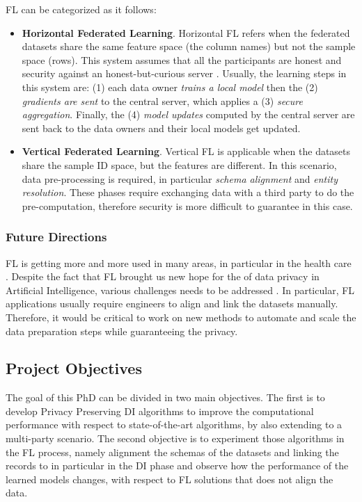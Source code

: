\documentclass[12pt]{article}
\begin{document}
FL can be categorized as it follows: 
\begin{itemize}
   \item \textbf{Horizontal Federated Learning}. Horizontal FL refers when the federated datasets share the same feature space (the column names) but not the sample space (rows). This system
   assumes that all the participants are honest and security against an honest-but-curious server \cite*{Yang2019}. Usually, the learning steps in this system are: (1) 
   each data owner \textit{trains a local model} then the (2) \textit{gradients are sent} to the central server, which applies a (3) \textit{secure aggregation}. 
   Finally, the (4) \textit{model updates} computed by the central server are sent back to the data owners and their local models get updated.
   \item \textbf{Vertical Federated Learning}. Vertical FL is applicable when the datasets share the sample ID space, but the features are different. In this scenario, data pre-processing is required, in particular 
   \textit{schema alignment} and \textit{entity resolution}. These phases require exchanging data with a third party to do the pre-computation, therefore security is more difficult to guarantee in this case.
\end{itemize}

\subsubsection{Future Directions}
FL is getting more and more used in many areas, in particular in the health care \cite*{Che2022,Bou2019,app112311191}. Despite the fact 
that FL brought us new hope for the of data privacy in Artificial Intelligence, various challenges needs to be addressed \cite*{Kairouz2021}. 
In particular, FL applications usually require engineers to align and link the datasets manually. Therefore, it would be critical to work 
on new methods to automate and scale the data preparation steps while guaranteeing the privacy.

\subsection{Project Objectives}
The goal of this PhD can be divided in two main objectives. The first is to develop Privacy Preserving DI algorithms to improve the computational 
performance with respect to state-of-the-art algorithms, by also extending to a multi-party scenario.
The second objective is to experiment those algorithms in the FL process, namely alignment the schemas of the datasets and linking the records to 
in particular in the DI phase and observe how the performance of the learned models changes, with respect to FL solutions that does not align the data. 
\end{document}
